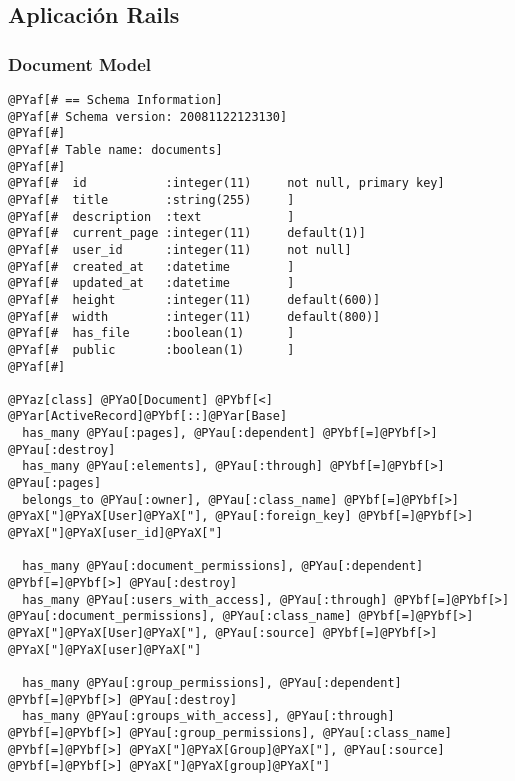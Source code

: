 \subsection{Aplicación Rails} %
\label{sub:aplicación_rails}

\subsubsection{Document Model} %
\label{ssub:document_model}

\begin{Verbatim}[commandchars=@\[\]]
@PYaf[# == Schema Information]
@PYaf[# Schema version: 20081122123130]
@PYaf[#]
@PYaf[# Table name: documents]
@PYaf[#]
@PYaf[#  id           :integer(11)     not null, primary key]
@PYaf[#  title        :string(255)     ]
@PYaf[#  description  :text            ]
@PYaf[#  current_page :integer(11)     default(1)]
@PYaf[#  user_id      :integer(11)     not null]
@PYaf[#  created_at   :datetime        ]
@PYaf[#  updated_at   :datetime        ]
@PYaf[#  height       :integer(11)     default(600)]
@PYaf[#  width        :integer(11)     default(800)]
@PYaf[#  has_file     :boolean(1)      ]
@PYaf[#  public       :boolean(1)      ]
@PYaf[#]

@PYaz[class] @PYaO[Document] @PYbf[<] @PYar[ActiveRecord]@PYbf[::]@PYar[Base]
  has_many @PYau[:pages], @PYau[:dependent] @PYbf[=]@PYbf[>] @PYau[:destroy]
  has_many @PYau[:elements], @PYau[:through] @PYbf[=]@PYbf[>] @PYau[:pages]
  belongs_to @PYau[:owner], @PYau[:class_name] @PYbf[=]@PYbf[>] @PYaX["]@PYaX[User]@PYaX["], @PYau[:foreign_key] @PYbf[=]@PYbf[>] @PYaX["]@PYaX[user_id]@PYaX["]
  
  has_many @PYau[:document_permissions], @PYau[:dependent] @PYbf[=]@PYbf[>] @PYau[:destroy]
  has_many @PYau[:users_with_access], @PYau[:through] @PYbf[=]@PYbf[>] @PYau[:document_permissions], @PYau[:class_name] @PYbf[=]@PYbf[>] @PYaX["]@PYaX[User]@PYaX["], @PYau[:source] @PYbf[=]@PYbf[>] @PYaX["]@PYaX[user]@PYaX["]
  
  has_many @PYau[:group_permissions], @PYau[:dependent] @PYbf[=]@PYbf[>] @PYau[:destroy]
  has_many @PYau[:groups_with_access], @PYau[:through] @PYbf[=]@PYbf[>] @PYau[:group_permissions], @PYau[:class_name] @PYbf[=]@PYbf[>] @PYaX["]@PYaX[Group]@PYaX["], @PYau[:source] @PYbf[=]@PYbf[>] @PYaX["]@PYaX[group]@PYaX["]
  

\end{Verbatim}
